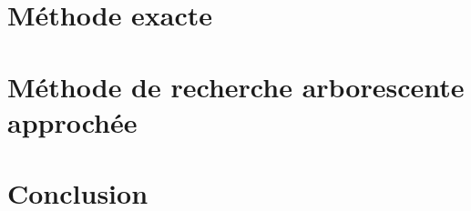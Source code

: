 \documentclass[12pt]{article}
\begin{document}

\section{Méthode exacte}







\section{Méthode de recherche arborescente approchée}



\section{Conclusion}



\end{document}
